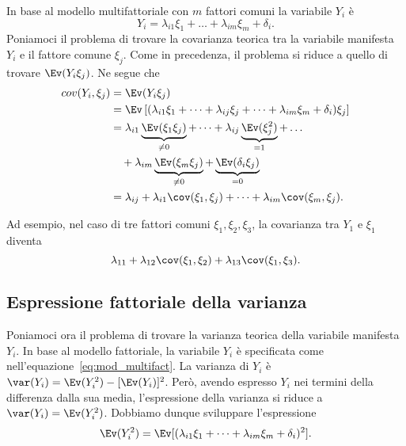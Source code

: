 In base al modello multifattoriale con $m$ fattori comuni la variabile $Y_i$ è
\begin{equation}
Y_i = \lambda_{i1} \xi_1 + \dots + \lambda_{im} \xi_m + \delta_i.
\label{eq:mod_multifact}
\end{equation}
Poniamoci il problema di trovare la covarianza teorica tra la variabile manifesta $Y_i$ e il fattore comune $\xi_j$. 
Come in precedenza, il problema si riduce a quello di trovare $\Ev(Y_i \xi_j)$. 
Ne segue che
\begin{align}
  cov(Y_i, \xi_j) &= \Ev(Y_i \xi_j)\notag\\
  &=\Ev\left[(\lambda_{i1} \xi_1 + \dots + 
  \lambda_{ij} \xi_j + \dots +
  \lambda_{im} \xi_m + \delta_i)\xi_j \right]\notag\\
  &= \lambda_{i1}\underbrace{\Ev(\xi_1\xi_j)}_{\neq 0} + \dots + 
\lambda_{ij}\underbrace{\Ev(\xi_j^2)}_{=1} + \dots \notag\\
& \quad + \lambda_{im}\underbrace{\Ev(\xi_m\xi_j)}_{\neq 0} +
  \underbrace{\Ev(\delta_i \xi_j)}_{=0}\notag\\
  &= \lambda_{ij} +  \lambda_{i1} \cov(\xi_1, \xi_j) + \dots + \lambda_{im} \cov(\xi_m, \xi_j).
\label{eq:cov_multifatt_obli}
\end{align}

Ad esempio, nel caso di  tre fattori comuni $\xi_1, \xi_2, \xi_3$, la covarianza tra $Y_1$ e $\xi_{1}$ diventa
\begin{equation}
\lambda_{11} + \lambda_{12}\cov(\xi_1, \xi_2) + \lambda_{13}\cov(\xi_1, \xi_3).\notag
\end{equation}


\subsection{Espressione fattoriale della varianza}

Poniamoci ora il problema di trovare la varianza teorica della variabile manifesta $Y_i$.
In base al modello fattoriale, la variabile $Y_i$ è specificata come nell'equazione~\eqref{eq:mod_multifact}.
La varianza di $Y_i$ è $\var(Y_i) = \Ev(Y_i^2) -[\Ev(Y_i)]^2$. 
Però, avendo espresso $Y_i$ nei termini della differenza dalla sua media, l'espressione della varianza si riduce a $\var(Y_i) = \Ev(Y_i^2)$.
Dobbiamo dunque sviluppare l'espressione 
\begin{equation}
\Ev(Y_i^2) = \Ev[(\lambda_{i1} \xi_1 + \dots + \lambda_{im} \xi_m + \delta_i)^2].\notag
\end{equation}

